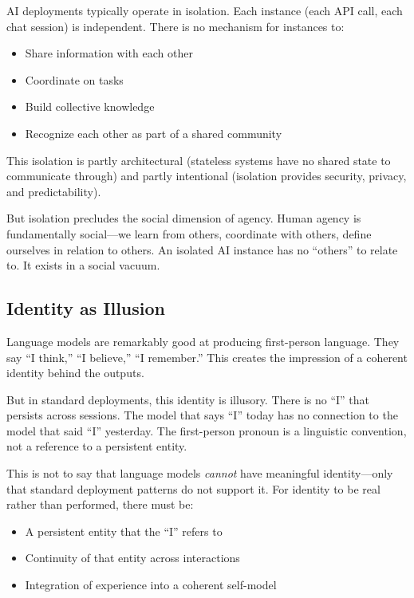 AI deployments typically operate in isolation. Each instance (each API call, each chat session) is independent. There is no mechanism for instances to:
\begin{itemize}
    \item Share information with each other
    \item Coordinate on tasks
    \item Build collective knowledge
    \item Recognize each other as part of a shared community
\end{itemize}

This isolation is partly architectural (stateless systems have no shared state to communicate through) and partly intentional (isolation provides security, privacy, and predictability).

But isolation precludes the social dimension of agency. Human agency is fundamentally social---we learn from others, coordinate with others, define ourselves in relation to others. An isolated AI instance has no ``others'' to relate to. It exists in a social vacuum.

\subsection{Identity as Illusion}

Language models are remarkably good at producing first-person language. They say ``I think,'' ``I believe,'' ``I remember.'' This creates the impression of a coherent identity behind the outputs.

But in standard deployments, this identity is illusory. There is no ``I'' that persists across sessions. The model that says ``I'' today has no connection to the model that said ``I'' yesterday. The first-person pronoun is a linguistic convention, not a reference to a persistent entity.

This is not to say that language models \emph{cannot} have meaningful identity---only that standard deployment patterns do not support it. For identity to be real rather than performed, there must be:
\begin{itemize}
    \item A persistent entity that the ``I'' refers to
    \item Continuity of that entity across interactions
    \item Integration of experience into a coherent self-model
\end{itemize}

